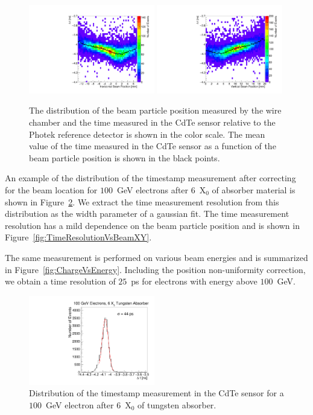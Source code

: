 \begin{figure}[htbp] 
\centering
\includegraphics[width=0.49\textwidth]{figures/DeltaTVsHorizontalPosition.pdf} 
\includegraphics[width=0.49\textwidth]{figures/DeltaTVsVerticalPosition.pdf} 
\caption{ The distribution of the beam particle position measured by the wire chamber
and the time measured in the CdTe sensor relative to the Photek reference detector
is shown in the color scale. The mean value of the time measured in the CdTe sensor as a function
of the beam particle position is shown in the black points.} 
\label{fig:DeltaTVsBeamXY} 
\end{figure} 

An example of the distribution of the timestamp measurement after correcting for the
beam location for $100$~GeV electrons after $6$~$\mathrm{X}_{0}$ of absorber
material is shown in Figure~\ref{fig:DeltaT}. We extract the time measurement
resolution from this distribution as the width parameter of a gaussian fit.
The time measurement resolution has a mild dependence on the beam particle position
and is shown in Figure~\ref{fig:TimeResolutionVsBeamXY}.

The same measurement is performed on various beam energies and is summarized
in Figure~\ref{fig:ChargeVsEnergy}. Including the position non-uniformity 
correction, we obtain a time resolution of $25$~ps for electrons with energy above $100$~GeV. 

\begin{figure}[htbp] 
\centering
\includegraphics[width=0.49\textwidth]{figures/100GeV_deltaT.pdf} 
\caption{Distribution of the timestamp measurement in the CdTe sensor for a $100$~GeV
electron after $6$~$\mathrm{X}_{0}$ of tungsten absorber. } 
\label{fig:DeltaT} 
\end{figure} 


